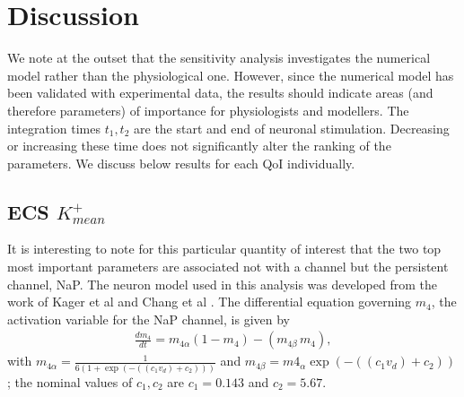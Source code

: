 \section{Discussion}
We  note at the outset that the sensitivity analysis investigates the numerical model rather than the physiological one. However, since the numerical model has been validated with experimental data,  the results should indicate areas (and therefore parameters) of importance for physiologists and modellers. The integration times $t_1,t_2$ are the start and end of neuronal stimulation. Decreasing or increasing these time does not significantly alter the ranking of the parameters. We discuss below results for each QoI individually. 


\subsection{ECS $K^+_{mean}$}
It is interesting to note for this particular quantity of interest that the two top most important parameters are associated not with a \pot channel but the persistent \na channel, NaP.  The neuron model used in this analysis was developed from the work of Kager et al \cite{Kager2000a} and Chang et al \cite{Chang2013}.
The differential equation governing $m_4$,  the activation variable for the NaP channel, is given by 
\begin{eqnarray}
\frac{d m_4}{dt} = m_{4 \alpha}(1 - m_4) - (m_{4\beta} \, m_4), \label{eqn:m4alpha}
\end{eqnarray}
with $\displaystyle m_{4 \alpha}= \frac{1}{6(1 + \exp(-((c_1 v_d) + c_2)))}$ and $m_{4 \beta} = m4_{\alpha} \exp(-((c_1 v_d) + c_2))$; the nominal values of $c_1,c_2$ are $c_1=0.143$ and $c_2=5.67$.

